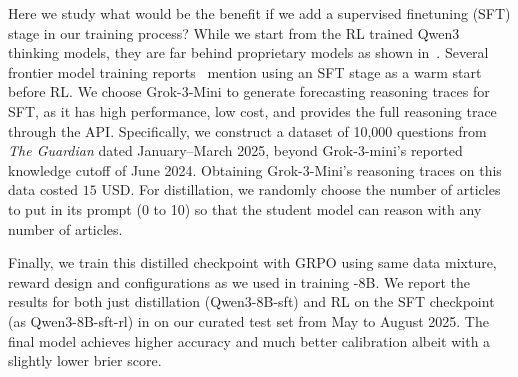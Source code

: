 \vspace{-.2cm}
Here we study what would be the benefit if we add a supervised finetuning (SFT) stage in our training process? While we start from the RL trained Qwen3 thinking models, they are far behind proprietary models as shown in~. Several frontier model training reports~\citep{guo2025deepseek} mention using an SFT stage as a warm start before RL. We choose Grok-3-Mini to generate forecasting reasoning traces for SFT, as it has high performance, low cost, and provides the full reasoning trace through the API. 
Specifically, we construct a dataset of 10,000 questions from \textit{The Guardian} dated January–March 2025, beyond Grok-3-mini's reported knowledge cutoff of June 2024. Obtaining Grok-3-Mini's reasoning traces on this data costed $15$ USD. For distillation, we randomly choose the number of articles to put in its prompt (0 to 10) so that the student model can reason with any number of articles.  %

Finally, we train this distilled checkpoint with GRPO using same data mixture, reward design and configurations as we used in training \ourmodel-8B. We report the results for both just distillation (Qwen3-8B-sft) and RL on the SFT checkpoint (as Qwen3-8B-sft-rl) in  on our curated test set from May to August 2025. The final model achieves higher accuracy and much better calibration albeit with a slightly lower brier score. 






